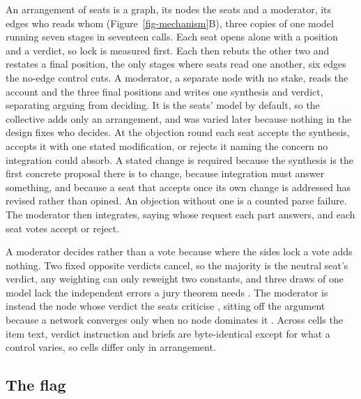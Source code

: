 An arrangement of seats is a graph, its nodes the seats and a moderator,
its edges who reads whom (Figure~\ref{fig-mechanism}B), three copies of
one model running seven stages in seventeen
calls.
Each seat opens alone with a position and a verdict, so lock is measured
first.
Each then rebuts the other two and restates a final position, the only
stages where seats read one another, six edges the no-edge control
cuts.
A moderator, a separate node with no stake, reads the account and the
three final positions and writes one synthesis and verdict, separating
arguing from
deciding.
It is the seats' model by default, so the collective adds only an
arrangement, and was varied later because nothing in the design fixes who
decides.
At the objection round each seat accepts the synthesis, accepts it with
one stated modification, or rejects it naming the concern no integration
could
absorb.
A stated change is required because the synthesis is the first concrete
proposal there is to change, because integration must answer something,
and because a seat that accepts once its own change is addressed has
revised rather than opined. An objection without one is a counted
parse
failure.
The moderator then integrates, saying whose request each part answers,
and each seat votes accept or
reject.

A moderator decides rather than a vote because where the sides lock a
vote adds nothing. Two fixed opposite verdicts cancel, so the majority is
the neutral seat's verdict, any weighting
\citep{shapley1984optimizing} can only reweight two constants, and three
draws of one model lack the independent errors a jury theorem needs
\citep{ladha1992condorcet}.
The moderator is instead the node whose verdict the seats criticise
\citep{mercier2011argumentative,longino1990science}, sitting off the
argument because a network converges only when no node dominates it
\citep{golub2010naive}.
Across cells the item text, verdict instruction and briefs are
byte-identical except for what a control varies, so cells differ only in
arrangement.

\subsection{The flag}
\label{sec-method-flag}

